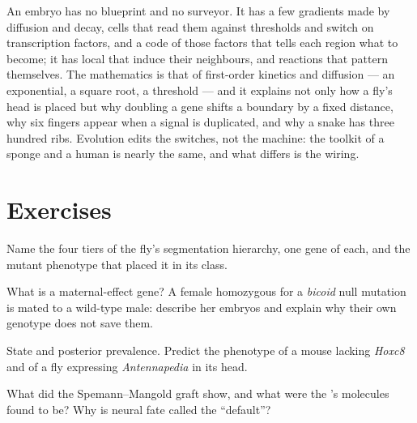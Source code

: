 \begin{remark}\label{rem:b3:developmental-genetics:remark}
An embryo has no blueprint and no surveyor. It has a few gradients
made by diffusion and decay, cells that read them against thresholds
and switch on transcription factors, and a code of those factors that
tells each region what to become; it has local  that induce
their neighbours, and reactions that pattern themselves. The
mathematics is that of first-order kinetics and diffusion --- an
exponential, a square root, a threshold --- and it explains not only
how a fly's head is placed but why doubling a gene shifts a boundary
by a fixed distance, why six fingers appear when a signal is
duplicated, and why a snake has three hundred ribs. Evolution edits the
switches, not the machine: the toolkit of a sponge and a human is
nearly the same, and what differs is the wiring.
\end{remark}

\section{Exercises}

\begin{exercise}[$\star$]\label{exo:b3:developmental-genetics:1}
Name the four tiers of the fly's segmentation hierarchy, one gene of
each, and the mutant phenotype that placed it in its class.
\end{exercise}

\begin{exercise}[$\star$]\label{exo:b3:developmental-genetics:2}
What is a maternal-effect gene? A female homozygous for a \emph{bicoid}
null mutation is mated to a wild-type male: describe her embryos and
explain why their own genotype does not save them.
\end{exercise}

\begin{exercise}[$\star$]\label{exo:b3:developmental-genetics:3}
State  and posterior prevalence. Predict the phenotype of a
mouse lacking \emph{Hoxc8} and of a fly expressing \emph{Antennapedia}
in its head.
\end{exercise}

\begin{exercise}[$\star$]\label{exo:b3:developmental-genetics:4}
What did the Spemann--Mangold graft show, and what were the 's
molecules found to be? Why is neural fate called the ``default''?
\end{exercise}

